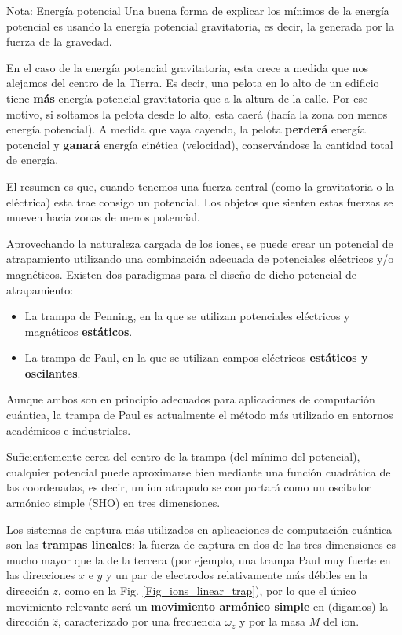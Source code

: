 \begin{mybox_blue}{Nota: Energía potencial}
Una buena forma de explicar los mínimos de la energía potencial es usando la energía potencial gravitatoria, es decir, la generada por la fuerza de la gravedad. 
\vspace{0.3cm}

En el caso de la energía potencial gravitatoria, esta crece a medida que nos alejamos del centro de la Tierra. Es decir, una pelota en lo alto de un edificio tiene \textbf{más} energía potencial gravitatoria que a la altura de la calle. Por ese motivo, si soltamos la pelota desde lo alto, esta caerá  (hacía la zona con menos energía potencial). A medida que vaya cayendo, la pelota \textbf{perderá} energía potencial y \textbf{ganará} energía cinética (velocidad), conservándose la cantidad total de energía.
\vspace{0.3cm}

El resumen es que, cuando tenemos una fuerza central (como la gravitatoria o la eléctrica) esta trae consigo un potencial. Los objetos que sienten estas fuerzas se mueven hacia zonas de menos potencial.
\end{mybox_blue}


Aprovechando la naturaleza cargada de los iones, se puede crear un potencial de atrapamiento utilizando una combinación adecuada de potenciales eléctricos y/o magnéticos. Existen dos paradigmas para el diseño de dicho potencial de atrapamiento: 

\begin{itemize}
\item La trampa de Penning, en la que se utilizan potenciales eléctricos y magnéticos \textbf{estáticos}. 

\item La trampa de Paul, en la que se utilizan campos eléctricos \textbf{estáticos y oscilantes}.
\end{itemize}

Aunque ambos son en principio adecuados para aplicaciones de computación cuántica, la trampa de Paul es actualmente el método más utilizado en entornos académicos e industriales. 

Suficientemente cerca del centro de la trampa (del mínimo del potencial), cualquier potencial puede aproximarse bien mediante una función cuadrática de las coordenadas, es decir, un ion atrapado se comportará como un oscilador armónico simple (SHO) en tres dimensiones. 

Los sistemas de captura más utilizados en aplicaciones de computación cuántica son las \textbf{trampas lineales}: la fuerza de captura en dos de las tres dimensiones es mucho mayor que la de la tercera (por ejemplo, una trampa Paul muy fuerte en las direcciones $x$ e $y$ y un par de electrodos relativamente más débiles en la dirección $z$, como en la Fig. \ref{Fig_ions_linear_trap}), por lo que el único movimiento relevante será un \textbf{movimiento armónico simple} en (digamos) la dirección $\hat{z}$, caracterizado por una frecuencia $\omega_z$ y por la masa $M$ del ion.


